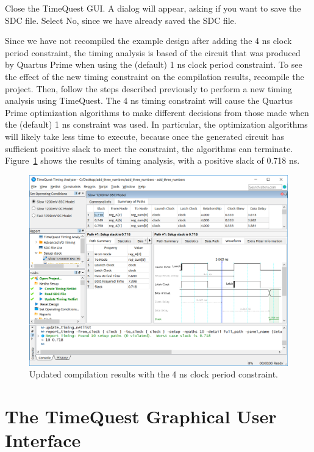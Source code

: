 \documentclass[11pt, twoside, pdftex]{article}
\begin{document}
Close the TimeQuest GUI. A dialog will appear, asking if you want to save the SDC file.
Select {\sf No}, since we have already saved the SDC file.

Since we have not recompiled the example design after adding the 4 ns clock period
constraint, the timing analysis is based of the circuit that was produced by Quartus Prime
when using the (default) 1 ns clock period constraint. To see the effect of the new timing
constraint on the compilation results, recompile the project. Then, follow the steps described
previously to perform a new timing analysis using TimeQuest. The 4 ns timing constraint
will cause the Quartus Prime optimization algorithms to make different decisions from those
made when the (default) 1 ns constraint was used. In particular, the optimization
algorithms will likely take less time to execute, because once the generated circuit has
sufficient positive slack to meet the constraint, the algorithms can terminate. 
Figure~\ref{fig:SB9} shows the results of timing analysis, with a positive slack of 0.718 ns. 

\begin{figure}[H]
\begin{center}
\includegraphics[scale=0.5]{figures/SB9.png}
\end{center}
\caption{Updated compilation results with the 4 ns clock period constraint.}
\label{fig:SB9}
\end{figure}

\newpage
\section{The TimeQuest Graphical User Interface}
\label{sec:TQGUI}
\end{document}
